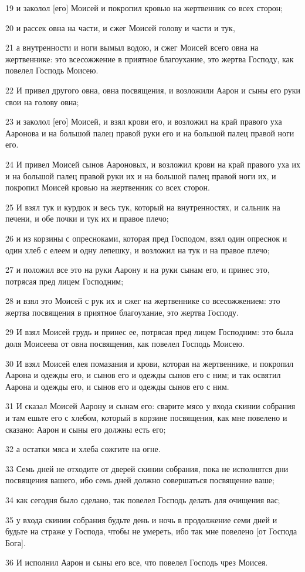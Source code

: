 \par 19 и заколол [его] Моисей и покропил кровью на жертвенник со всех сторон;
\par 20 и рассек овна на части, и сжег Моисей голову и части и тук,
\par 21 а внутренности и ноги вымыл водою, и сжег Моисей всего овна на жертвеннике: это всесожжение в приятное благоухание, это жертва Господу, как повелел Господь Моисею.
\par 22 И привел другого овна, овна посвящения, и возложили Аарон и сыны его руки свои на голову овна;
\par 23 и заколол [его] Моисей, и взял крови его, и возложил на край правого уха Ааронова и на большой палец правой руки его и на большой палец правой ноги его.
\par 24 И привел Моисей сынов Аароновых, и возложил крови на край правого уха их и на большой палец правой руки их и на большой палец правой ноги их, и покропил Моисей кровью на жертвенник со всех сторон.
\par 25 И взял тук и курдюк и весь тук, который на внутренностях, и сальник на печени, и обе почки и тук их и правое плечо;
\par 26 и из корзины с опресноками, которая пред Господом, взял один опреснок и один хлеб с елеем и одну лепешку, и возложил на тук и на правое плечо;
\par 27 и положил все это на руки Аарону и на руки сынам его, и принес это, потрясая пред лицем Господним;
\par 28 и взял это Моисей с рук их и сжег на жертвеннике со всесожжением: это жертва посвящения в приятное благоухание, это жертва Господу.
\par 29 И взял Моисей грудь и принес ее, потрясая пред лицем Господним: это была доля Моисеева от овна посвящения, как повелел Господь Моисею.
\par 30 И взял Моисей елея помазания и крови, которая на жертвеннике, и покропил Аарона и одежды его, и сынов его и одежды сынов его с ним; и так освятил Аарона и одежды его, и сынов его и одежды сынов его с ним.
\par 31 И сказал Моисей Аарону и сынам его: сварите мясо у входа скинии собрания и там ешьте его с хлебом, который в корзине посвящения, как мне повелено и сказано: Аарон и сыны его должны есть его;
\par 32 а остатки мяса и хлеба сожгите на огне.
\par 33 Семь дней не отходите от дверей скинии собрания, пока не исполнятся дни посвящения вашего, ибо семь дней должно совершаться посвящение ваше;
\par 34 как сегодня было сделано, так повелел Господь делать для очищения вас;
\par 35 у входа скинии собрания будьте день и ночь в продолжение семи дней и будьте на страже у Господа, чтобы не умереть, ибо так мне повелено [от Господа Бога].
\par 36 И исполнил Аарон и сыны его все, что повелел Господь чрез Моисея.

